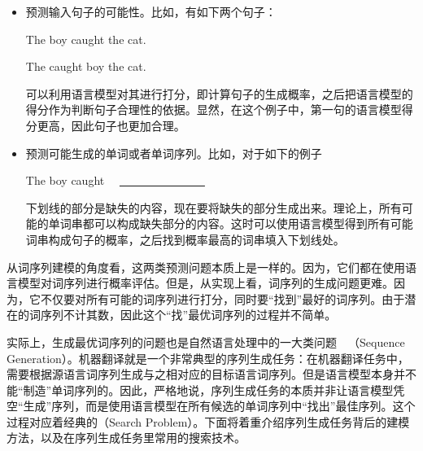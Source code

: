 \begin{itemize}
\vspace{0.5em}
\item 预测输入句子的可能性。比如，有如下两个句子：

\vspace{0.8em}
\hspace{10em} The boy caught the cat.

\vspace{0.8em}
\hspace{10em} The caught boy the cat.

\vspace{0.8em}

\noindent 可以利用语言模型对其进行打分，即计算句子的生成概率，之后把语言模型的得分作为判断句子合理性的依据。显然，在这个例子中，第一句的语言模型得分更高，因此句子也更加合理。

\vspace{0.5em}
\item 预测可能生成的单词或者单词序列。比如，对于如下的例子

\vspace{0.8em}
\hspace{10em} The boy caught \ \ \underline{\ \ \ \ \ \ \ \ \ \ \ \ \ \ \ }
\vspace{0.8em}

\noindent 下划线的部分是缺失的内容，现在要将缺失的部分生成出来。理论上，所有可能的单词串都可以构成缺失部分的内容。这时可以使用语言模型得到所有可能词串构成句子的概率，之后找到概率最高的词串填入下划线处。

\vspace{0.5em}
\end{itemize}

\parinterval 从词序列建模的角度看，这两类预测问题本质上是一样的。因为，它们都在使用语言模型对词序列进行概率评估。但是，从实现上看，词序列的生成问题更难。因为，它不仅要对所有可能的词序列进行打分，同时要“找到”最好的词序列。由于潜在的词序列不计其数，因此这个“找”最优词序列的过程并不简单。

\parinterval 实际上，生成最优词序列的问题也是自然语言处理中的一大类问题\ \dash\ {\small{}}（Sequence Generation）。机器翻译就是一个非常典型的序列生成任务：在机器翻译任务中，需要根据源语言词序列生成与之相对应的目标语言词序列。但是语言模型本身并不能“制造”单词序列的。因此，严格地说，序列生成任务的本质并非让语言模型凭空“生成”序列，而是使用语言模型在所有候选的单词序列中“找出”最佳序列。这个过程对应着经典的{\small{}}（Search Problem）。下面将着重介绍序列生成任务背后的建模方法，以及在序列生成任务里常用的搜索技术。

